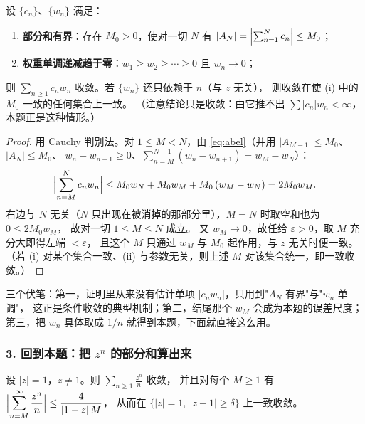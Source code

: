 \begin{corollary}\label{cor:dirichlet}
设 $\{c_n\}$、$\{w_n\}$ 满足：
\begin{enumerate}[label=(\roman*), leftmargin=2.4em]
\item \textbf{部分和有界}：存在 $M_0>0$，使对一切 $N$ 有 $|A_N|=\Bigl|\sum_{n=1}^Nc_n\Bigr|\le M_0$；
\item \textbf{权重单调递减趋于零}：$w_1\ge w_2\ge\cdots\ge0$ 且 $w_n\to0$；
\end{enumerate}
则 $\sum_{n\ge1}c_nw_n$ 收敛。若 $\{w_n\}$ 还只依赖于 $n$（与 $z$ 无关），
则收敛在使 (i) 中的 $M_0$ 一致的任何集合上一致。
（注意结论只是收敛：由它推不出 $\sum|c_n|w_n<\infty$，本题正是这种情形。）
\end{corollary}

\begin{proof}
用 Cauchy 判别法。对 $1\le M<N$，由 \eqref{eq:abel}（并用 $|A_{M-1}|\le M_0$、$|A_N|\le M_0$、
$w_n-w_{n+1}\ge0$、$\sum_{n=M}^{N-1}(w_n-w_{n+1})=w_M-w_N$）：
\[
\Bigl|\sum_{n=M}^{N}c_nw_n\Bigr|
\le M_0w_N+M_0w_M+M_0\,(w_M-w_N)
=2M_0w_M .
\]
右边与 $N$ 无关（$N$ 只出现在被消掉的那部分里），$M=N$ 时取空和也为 $0\le2M_0w_M$，
故对一切 $1\le M\le N$ 成立。
又 $w_M\to0$，故任给 $\varepsilon>0$，取 $M$ 充分大即得左端 $<\varepsilon$，
且这个 $M$ 只通过 $w_M$ 与 $M_0$ 起作用，与 $z$ 无关时便一致。
（若 (i) 对某个集合一致、(ii) 与参数无关，则上述 $M$ 对该集合统一，即一致收敛。）
\end{proof}

\noindent
三个伏笔：第一，证明里从来没有估计单项 $|c_nw_n|$，只用到"$A_N$ 有界"与"$w_n$ 单调"，
这正是条件收敛的典型机制；第二，结尾那个 $w_M$ 会成为本题的误差尺度；
第三，把 $w_n$ 具体取成 $1/n$ 就得到本题，下面就直接这么用。

\subsubsection*{3. 回到本题：把 $z^n$ 的部分和算出来}
\label{sec:circle-apply}

\begin{proposition}\label{prop:circle}
设 $|z|=1$，$z\ne1$。则 $\displaystyle\sum_{n\ge1}\frac{z^n}{n}$ 收敛，
并且对每个 $M\ge1$ 有 $\displaystyle\Bigl|\sum_{n=M}^{\infty}\frac{z^n}{n}\Bigr|\le\frac{4}{|1-z|\,M}$，
从而在 $\{|z|=1,\ |z-1|\ge\delta\}$ 上一致收敛。
\end{proposition}

